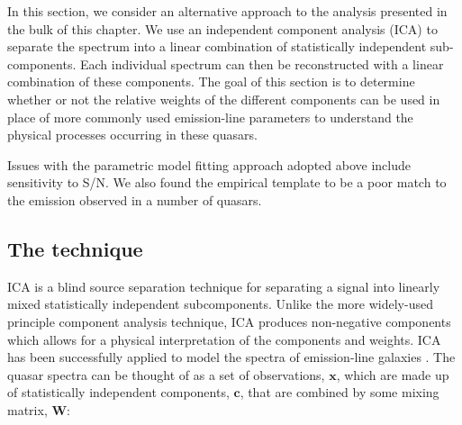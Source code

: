 


In this section, we consider an alternative approach to the analysis presented in the bulk of this chapter. 
We use an independent component analysis (ICA) to separate the spectrum into a linear combination of statistically independent sub-components. 
Each individual spectrum can then be reconstructed with a linear combination of these components. 
The goal of this section is to determine whether or not the relative weights of the different components can be used in place of more commonly used emission-line parameters to understand the physical processes occurring in these quasars. 

Issues with the parametric model fitting approach adopted above include sensitivity to S/N. 
We also found the empirical template to be a poor match to the  emission observed in a number of quasars. 

\subsection{The technique}
 
ICA is a blind source separation technique for separating a signal into linearly mixed statistically independent subcomponents. 
Unlike the more widely-used principle component analysis technique, ICA produces non-negative components which allows for a physical interpretation of the components and weights.  
ICA has been successfully applied to model the spectra of emission-line galaxies \citep{allen13}. 
The quasar spectra can be thought of as a set of observations, $\bm{x}$, which are made up of statistically independent components, $\bm{c}$, that are combined by some mixing matrix, $\bm{W}$:

